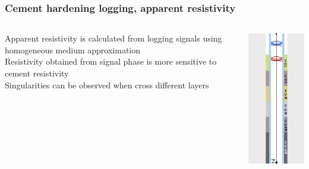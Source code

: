 \documentclass[aspectratio=169]{beamer}
\begin{document}
\begin{frame}
\frametitle{Cement hardening logging, apparent resistivity}


\begin{columns}[c] 

\begin{small}

Apparent resistivity is calculated from logging signals using homogeneous medium approximation\\
\vspace*{0.2cm}
Resistivity obtained from signal phase is more sensitive to cement resistivity \\
\vspace*{0.2cm}
Singularities can be observed when cross different layers

\end{small}

\includegraphics[scale=1.4]{cement_solid_model.eps}



\end{columns}
\end{frame}
\end{document}
